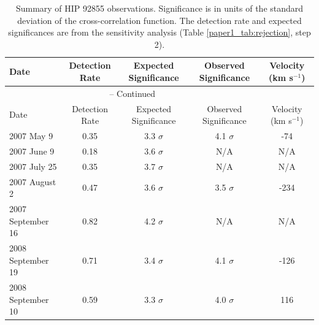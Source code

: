 \scriptsize 
\begin{samepage}
\begin{longtable}[t]{|lcccc|}

\caption{Summary of HIP 92855 observations. Significance is in units of
  the standard deviation of the cross-correlation function. The detection rate and expected significances are from the sensitivity analysis (Table \ref{paper1_tab:rejection}, step 2).} \\
\hline
Date & Detection Rate & Expected Significance & Observed Significance
& Velocity (km s$^{-1}$) \\ \hline
\endfirsthead

\multicolumn{4}{c}{{\tablename} \thetable{} -- Continued} \\
\hline
Date & Detection Rate & Expected Significance & Observed Significance
& Velocity (km s$^{-1}$) \\ \hline
\endhead

\hline
\endfoot

\hline
\endlastfoot

2007 May 9 & 0.35 & 3.3 $\sigma$ & 4.1 $\sigma$ & -74 \\
2007 June 9 & 0.18 & 3.6 $\sigma$ & N/A & N/A \\
2007 July 25 & 0.35 & 3.7 $\sigma$ & N/A & N/A \\
2007 August 2 & 0.47 & 3.6 $\sigma$ & 3.5 $\sigma$ & -234 \\
2007 September 16 & 0.82 & 4.2 $\sigma$ & N/A & N/A \\
2008 September 19 & 0.71 & 3.4 $\sigma$ & 4.1 $\sigma$ & -126 \\
2008 September 10 & 0.59 & 3.3 $\sigma$ & 4.0 $\sigma$ & 116 
\label{paper1_tab:hip92855}
\end{longtable}
\end{samepage}
\normalsize
